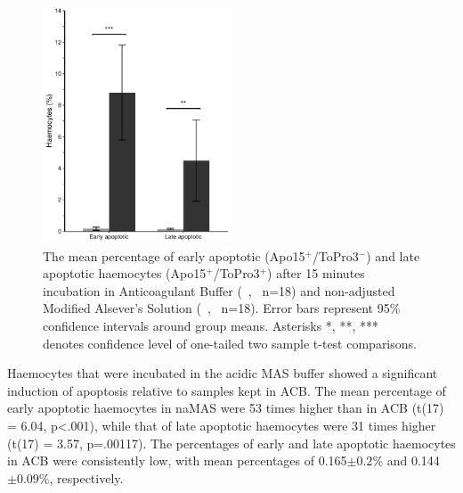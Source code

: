 \begin{figure}[H]
    \centering
    \includegraphics[width=0.5\textwidth]{figures/Method development/Apo15 pH.pdf}
    \caption{The mean percentage of early apoptotic (Apo15$^{+}$/ToPro3$^{-}$) and late apoptotic haemocytes (Apo15$^{+}$/ToPro3$^{+}$) after 15 minutes incubation in Anticoagulant Buffer (\, \protect\customgraybox, \ n=18) and non-adjusted Modified Alsever's Solution (\, \protect\darkgraybox, \ n=18). Error bars represent 95\% confidence intervals around group means. Asterisks *, **, *** denotes confidence level of one-tailed two sample t-test comparisons.}
    \label{fig:pH_Apo}
\end{figure}

Haemocytes that were incubated in the acidic MAS buffer showed a significant induction of apoptosis relative to samples kept in ACB. The mean percentage of early apoptotic haemocytes in naMAS were 53 times higher than in ACB (t(17) = 6.04, p<.001), while that of late apoptotic haemocytes were 31 times higher (t(17) = 3.57, p=.00117). The percentages of early and late apoptotic haemocytes in ACB were consistently low, with mean percentages of 0.165$\pm{0.2}$\% and 0.144$\pm{0.09}$\%, respectively.

